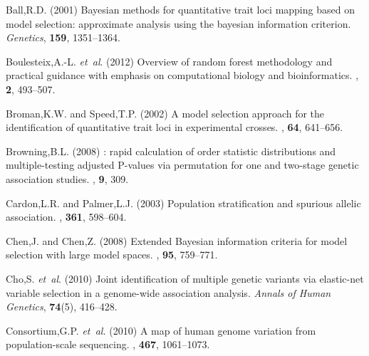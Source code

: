\documentclass{bioinfo}
\begin{document}
\begin{thebibliography}{}
  
Ball,R.D. (2001) Bayesian methods for quantitative trait loci mapping based on model
  selection: approximate analysis using the bayesian information criterion.
\textit{Genetics}, \textbf{159}, 1351--1364.

Boulesteix,A.-L.  \textit{et~al}. (2012)
\newblock Overview of random forest methodology and practical guidance with
  emphasis on computational biology and bioinformatics.
, {\bf 2}, 493--507.

Broman,K.W. and Speed,T.P. (2002)
\newblock A model selection approach for the identification of quantitative
  trait loci in experimental crosses.
, {\bf 64}, 641--656.

Browning,B.L. (2008)
: rapid calculation of order statistic distributions and
  multiple-testing adjusted {P}-values via permutation for one and two-stage
  genetic association studies.
, {\bf 9}, 309.

Cardon,L.R. and Palmer,L.J. (2003)
\newblock Population stratification and spurious allelic association.
, {\bf 361}, 598--604.

Chen,J. and Chen,Z. (2008)
\newblock Extended {B}ayesian information criteria for model selection with
  large model spaces.
, {\bf 95}, 759--771.



Cho,S. \textit{et~al}. (2010) Joint identification of multiple genetic variants via elastic-net
  variable selection in a genome-wide association analysis. \textit{Annals of Human Genetics}, {\bf 74}(5), 416--428.

Consortium,G.P. {\em et~al.} (2010)
\newblock A map of human genome variation from population-scale sequencing.
, {\bf 467}, 1061--1073.


\end{thebibliography}
\end{document}
